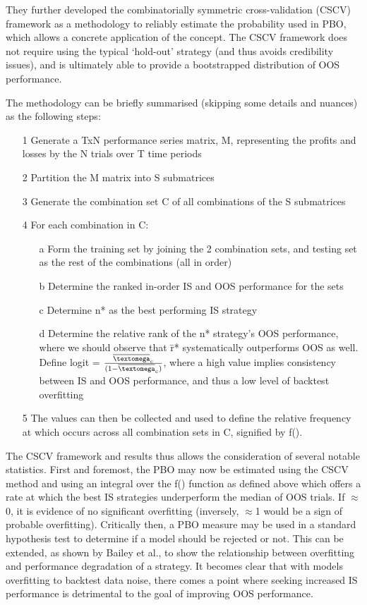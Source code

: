 \documentclass[a4paper,latin]{paper}
\begin{document}
They further developed the combinatorially symmetric cross-validation (CSCV) framework as a methodology to 
reliably estimate the probability used in PBO, which allows a concrete application of the concept. The CSCV 
framework does not require using the typical ‘hold-out’ strategy (and thus avoids credibility issues), and is 
ultimately able to provide a bootstrapped distribution of OOS performance. 
\hfill \break 

The methodology can be briefly summarised (skipping some details and nuances) as the following steps:
\begin{itemize}
 \item[1]Generate a TxN performance series matrix, M, representing the profits and losses by the N trials over T time periods
\item[2]Partition the M matrix into S submatrices
\item[3]Generate the combination set C of all combinations of the S submatrices
\item[4]For each combination in C:
\begin{itemize}
\item [a] Form the training set by joining the 2 combination sets, and testing set as the rest of the combinations (all in order)
\item [b] Determine the ranked in-order IS and OOS performance for the sets
\item [c] Determine n* as the best performing IS strategy
\item [d] Determine the relative rank of the n* strategy’s OOS performance, where we should observe that \={r}* systematically outperforms OOS as 
well. Define logit \textlambda = \(\frac{\overline{\textomega}_{c}}{(1 -\overline{\textomega}_{c} )}\), where a high value implies consistency 
between IS and OOS performance, and thus a low level of backtest overfitting
\end{itemize}
\item [5] The {\textlambda} values can then be collected and used to define the relative frequency at which \textlambda 
occurs across all combination sets in C, signified by f(\textlambda).
\end{itemize}

The CSCV framework and results thus allows the consideration of several notable statistics. First and foremost, 
the PBO may now be estimated using the CSCV method and using an integral over the f(\textlambda) function 
as defined above which offers a rate at which the best IS strategies underperform the median of OOS trials. If \textphi $\approx$ 0,
 it is evidence of no significant overfitting (inversely, \textphi  $\approx$1 would be a sign of probable overfitting). Critically then, a 
 PBO measure may be used in a standard hypothesis test to determine if a model should be rejected or not. This 
 can be extended, as shown by Bailey et al., to show the relationship between overfitting and performance 
degradation of a strategy. It becomes clear that with models overfitting to backtest data noise, there comes a point 
where seeking increased IS performance is detrimental to the goal of improving OOS performance.  
\hfill \break 
\end{document}
